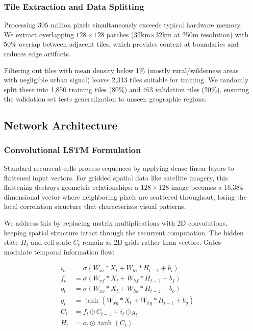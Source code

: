 \documentclass[conference]{IEEEtran}
\begin{document}
\subsubsection{Tile Extraction and Data Splitting}
Processing 305 million pixels simultaneously exceeds typical hardware memory. We extract overlapping $128\times128$ patches (32km$\times$32km at 250m resolution) with 50\% overlap between adjacent tiles, which provides context at boundaries and reduces edge artifacts.

Filtering out tiles with mean density below 1\% (mostly rural/wilderness areas with negligible urban signal) leaves 2,313 tiles suitable for training. We randomly split these into 1,850 training tiles (80\%) and 463 validation tiles (20\%), ensuring the validation set tests generalization to unseen geographic regions.

\subsection{Network Architecture}

\subsubsection{Convolutional LSTM Formulation}
Standard recurrent cells process sequences by applying dense linear layers to flattened input vectors. For gridded spatial data like satellite imagery, this flattening destroys geometric relationships: a $128\times128$ image becomes a 16,384-dimensional vector where neighboring pixels are scattered throughout, losing the local correlation structure that characterizes visual patterns.

We address this by replacing matrix multiplications with 2D convolutions, keeping spatial structure intact through the recurrent computation. The hidden state $H_t$ and cell state $C_t$ remain as 2D grids rather than vectors. Gates modulate temporal information flow:

\begin{align}
i_t &= \sigma(W_{xi} * X_t + W_{hi} * H_{t-1} + b_i) \label{eq:input_gate}\\
f_t &= \sigma(W_{xf} * X_t + W_{hf} * H_{t-1} + b_f) \label{eq:forget_gate}\\
o_t &= \sigma(W_{xo} * X_t + W_{ho} * H_{t-1} + b_o) \label{eq:output_gate}\\
g_t &= \tanh(W_{xg} * X_t + W_{hg} * H_{t-1} + b_g) \label{eq:candidate}\\
C_t &= f_t \odot C_{t-1} + i_t \odot g_t \label{eq:cell_update}\\
H_t &= o_t \odot \tanh(C_t) \label{eq:hidden_update}
\end{align}
\end{document}
